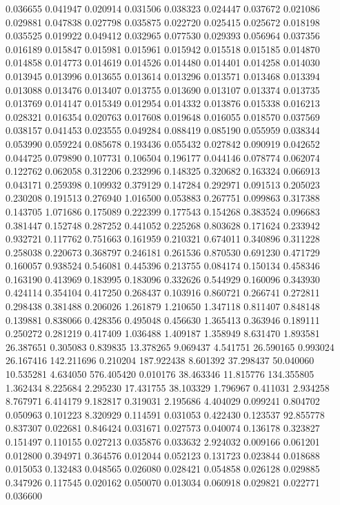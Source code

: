 0.036655
0.041947
0.020914
0.031506
0.038323
0.024447
0.037672
0.021086
0.029881
0.047838
0.027798
0.035875
0.022720
0.025415
0.025672
0.018198
0.035525
0.019922
0.049412
0.032965
0.077530
0.029393
0.056964
0.037356
0.016189
0.015847
0.015981
0.015961
0.015942
0.015518
0.015185
0.014870
0.014858
0.014773
0.014619
0.014526
0.014480
0.014401
0.014258
0.014030
0.013945
0.013996
0.013655
0.013614
0.013296
0.013571
0.013468
0.013394
0.013088
0.013476
0.013407
0.013755
0.013690
0.013107
0.013374
0.013735
0.013769
0.014147
0.015349
0.012954
0.014332
0.013876
0.015338
0.016213
0.028321
0.016354
0.020763
0.017608
0.019648
0.016055
0.018570
0.037569
0.038157
0.041453
0.023555
0.049284
0.088419
0.085190
0.055959
0.038344
0.053990
0.059224
0.085678
0.193436
0.055432
0.027842
0.090919
0.042652
0.044725
0.079890
0.107731
0.106504
0.196177
0.044146
0.078774
0.062074
0.122762
0.062058
0.312206
0.232996
0.148325
0.320682
0.163324
0.066913
0.043171
0.259398
0.109932
0.379129
0.147284
0.292971
0.091513
0.205023
0.230208
0.191513
0.276940
1.016500
0.053883
0.267751
0.099863
0.317388
0.143705
1.071686
0.175089
0.222399
0.177543
0.154268
0.383524
0.096683
0.381447
0.152748
0.287252
0.441052
0.225268
0.803628
0.171624
0.233942
0.932721
0.117762
0.751663
0.161959
0.210321
0.674011
0.340896
0.311228
0.258038
0.220673
0.368797
0.246181
0.261536
0.870530
0.691230
0.471729
0.160057
0.938524
0.546081
0.445396
0.213755
0.084174
0.150134
0.458346
0.163190
0.413969
0.183995
0.183096
0.332626
0.544929
0.160096
0.343930
0.424114
0.354104
0.417250
0.268437
0.103916
0.860721
0.266741
0.272811
0.298438
0.381488
0.206026
1.261879
1.210650
1.347118
0.811407
0.848148
0.139881
0.838066
0.428356
0.495048
0.456630
1.365413
0.363946
0.189111
0.250272
0.281219
0.417409
1.036488
1.409187
1.358949
8.631470
1.893581
26.387651
0.305083
0.839835
13.378265
9.069437
4.541751
26.590165
0.993024
26.167416
142.211696
0.210204
187.922438
8.601392
37.298437
50.040060
10.535281
4.634050
576.405420
0.010176
38.463346
11.815776
134.355805
1.362434
8.225684
2.295230
17.431755
38.103329
1.796967
0.411031
2.934258
8.767971
6.414179
9.182817
0.319031
2.195686
4.404029
0.099241
0.804702
0.050963
0.101223
8.320929
0.114591
0.031053
0.422430
0.123537
92.855778
0.837307
0.022681
0.846424
0.031671
0.027573
0.040074
0.136178
0.323827
0.151497
0.110155
0.027213
0.035876
0.033632
2.924032
0.009166
0.061201
0.012800
0.394971
0.364576
0.012044
0.052123
0.131723
0.023844
0.018688
0.015053
0.132483
0.048565
0.026080
0.028421
0.054858
0.026128
0.029885
0.347926
0.117545
0.020162
0.050070
0.013034
0.060918
0.029821
0.022771
0.036600
